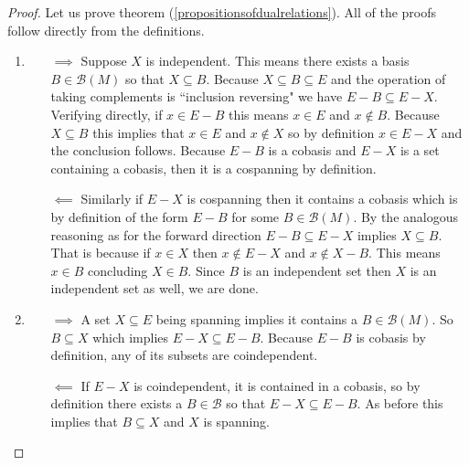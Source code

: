 \begin{proof}
    Let us prove theorem (\ref{propositionsofdualrelations}). All of the proofs follow directly from the definitions.

    \begin{enumerate}
        \item  \begin{enumerate}
            \item[$\implies$] Suppose $X$ is independent. This means there exists a basis $B \in \mathcal{B}(M)$ so that $X \subseteq B$. Because $X \subseteq B \subseteq E$ and the operation of taking complements is ``inclusion reversing" we have $E-B \subseteq E - X$. Verifying directly, if $x \in E - B$ this means $x \in E$ and $x \notin B$. Because $X \subseteq B$ this implies that $x \in E$ and $x \notin X$ so by definition $x \in E - X$ and the conclusion follows. Because $E - B$ is a cobasis and $E - X$ is a set containing a cobasis, then it is a cospanning by definition.
            \item[$\impliedby$] Similarly if $E - X$ is cospanning then it contains a cobasis which is by definition of the form $E - B$ for some $B \in \mathcal{B}(M)$. By the analogous reasoning as for the forward direction $E - B \subseteq E - X$ implies $X \subseteq B$. That is because if $x \in X$ then $x \notin E - X$ and $x \notin X - B$. This means $x \in B$ concluding $X \in B$. Since $B$ is an independent set then $X$ is an independent set as well, we are done.
        \end{enumerate}

   \item  \begin{enumerate}
    \item[$\implies$] A set $X\subseteq E$ being spanning implies it contains a $B \in \mathcal{B}(M)$. So  $B \subseteq X$ which implies $E - X \subseteq E - B$. Because $E - B$ is cobasis by definition, any of its subsets are coindependent. 
    \item[$\impliedby$] If $E - X$ is coindependent, it is contained in a cobasis, so by definition there exists a $B \in \mathcal{B}$ so that $E - X \subseteq E - B$. As before this implies that $B \subseteq X$ and $X$ is spanning.
   \end{enumerate}


\end{enumerate}
\end{proof}
